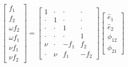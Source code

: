 \begin{equation}\label{eq:sys-Henry2015}
\left[\begin{array}{c}
     f_1     \\
     f_2     \\
  \omega f_2 \\
  \omega f_1 \\
    \nu f_1  \\
    \nu f_2
\end{array}\right]
=
\left[\begin{array}{cccc}
    1   & \cdot & \cdot & \cdot \\
  \cdot &   1   & \cdot & \cdot \\
  \cdot & \cdot &   1   & \cdot \\
  \cdot & \cdot & \cdot &   1   \\
   \nu  & \cdot & -f_1  &  f_2  \\
  \cdot &  \nu  &  f_1  & -f_2
\end{array}\right]
\left[\begin{array}{c}
  \hat{e}_1 \\
  \hat{e}_2 \\
  \phi_{12} \\
  \phi_{21}
\end{array}\right]
\end{equation}